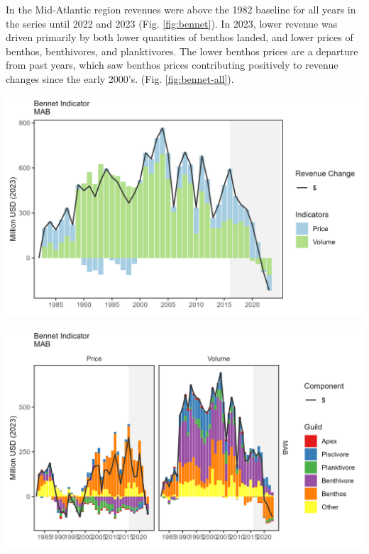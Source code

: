 \documentclass[
  10pt,
]{article}
\let\origfigure\figure
\let\endorigfigure\endfigure
\renewenvironment{figure}[1][2] {
    \expandafter\origfigure\expandafter[H]
} {
    \endorigfigure
}
\begin{document}
In the Mid-Atlantic region revenues were above the 1982 baseline for all years in the series until 2022 and 2023 (Fig. \ref{fig:bennet}). In 2023, lower revenue was driven primarily by both lower quantities of benthos landed, and lower prices of benthos, benthivores, and planktivores. The lower benthos prices are a departure from past years, which saw benthos prices contributing positively to revenue changes since the early 2000's. (Fig. \ref{fig:bennet-all}).

\begin{figure}

{\centering \includegraphics[width=6.5in]{images/MidAtlantic/bennet_MidAtlantic_2025-09-05} 

}

\caption{Revenue change from 1982 values in 2023 dollars (black); Price (PI), and Volume Indicators (VI) for total commercial landings in the Mid-Atlantic Bight.}\label{fig:bennet}
\end{figure}

\begin{figure}

{\centering \includegraphics[width=6.5in]{images/MidAtlantic/bennet_all_MidAtlantic_2025-09-05} 

}

\caption{Total price and volume indicators in 2023 dollars (black) for commercial landings, and individual guild contributions to each indicator, in the Mid-Atlantic Bight.}\label{fig:bennet-all}
\end{figure}
\end{document}
